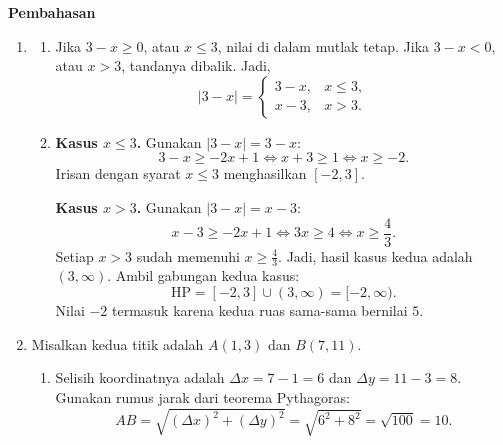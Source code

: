 \documentclass[10pt,letterpaper]{article}
\begin{document}
\newpage
\begingroup
\fontsize{10.95}{13.5}\selectfont
\setlength{\parskip}{3pt}
\textbf{\large Pembahasan}\par\medskip
\begin{enumerate}

  \item \begin{enumerate}
          \item Jika $3-x\ge0$, atau $x\le3$, nilai di dalam mutlak tetap.
                Jika $3-x<0$, atau $x>3$, tandanya dibalik.
                Jadi,
                \[
                  \boxed{|3-x|=
                    \begin{cases}
                      3-x, & x\le3, \\
                      x-3, & x>3.
                    \end{cases}}
                \]

          \item \textbf{Kasus $x\le3$.} Gunakan $|3-x|=3-x$:
                \[
                  3-x\ge-2x+1\iff x+3\ge1\iff x\ge-2.
                \]
                Irisan dengan syarat $x\le3$ menghasilkan $[-2,3]$.

                \textbf{Kasus $x>3$.} Gunakan $|3-x|=x-3$:
                \[
                  x-3\ge-2x+1\iff3x\ge4\iff x\ge\frac43.
                \]
                Setiap $x>3$ sudah memenuhi $x\ge\frac43$.
                Jadi, hasil kasus kedua adalah $(3,\infty)$.
                Ambil gabungan kedua kasus:
                \[
                  \boxed{\mathrm{HP}=[-2,3]\cup(3,\infty)=[-2,\infty)}.
                \]
                Nilai $-2$ termasuk karena kedua ruas sama-sama bernilai $5$.
        \end{enumerate}

  \item Misalkan kedua titik adalah $A(1,3)$ dan $B(7,11)$.
        \begin{enumerate}
          \item Selisih koordinatnya adalah $\Delta x=7-1=6$ dan $\Delta y=11-3=8$.
                Gunakan rumus jarak dari teorema Pythagoras:
                \[
                  AB=\sqrt{(\Delta x)^2+(\Delta y)^2}
                  =\sqrt{6^2+8^2}=\sqrt{100}=\boxed{10}.
                \]


\end{enumerate}
\end{enumerate}
\end{document}
